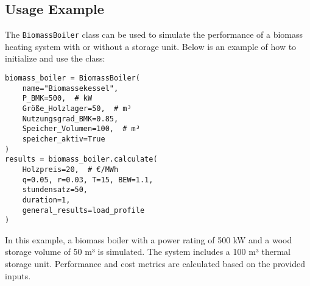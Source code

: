 \subsection{Usage Example}
The \texttt{BiomassBoiler} class can be used to simulate the performance of a biomass heating system with or without a storage unit. Below is an example of how to initialize and use the class:

\begin{verbatim}
biomass_boiler = BiomassBoiler(
    name="Biomassekessel",
    P_BMK=500,  # kW
    Größe_Holzlager=50,  # m³
    Nutzungsgrad_BMK=0.85,
    Speicher_Volumen=100,  # m³
    speicher_aktiv=True
)
results = biomass_boiler.calculate(
    Holzpreis=20,  # €/MWh
    q=0.05, r=0.03, T=15, BEW=1.1, 
    stundensatz=50, 
    duration=1, 
    general_results=load_profile
)
\end{verbatim}
In this example, a biomass boiler with a power rating of 500 kW and a wood storage volume of 50 m³ is simulated. The system includes a 100 m³ thermal storage unit. Performance and cost metrics are calculated based on the provided inputs.